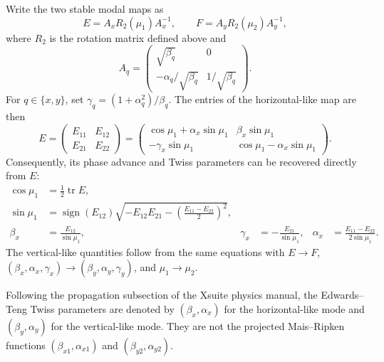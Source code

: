 \documentclass[11pt,a4paper]{article}
\newcommand{\Tr}{\operatorname{tr}}
\begin{document}
Write the two stable modal maps as
\begin{equation}
 E=A_xR_2(\mu_1)A_x^{-1},
 \qquad
 F=A_yR_2(\mu_2)A_y^{-1},
 \label{eq:et-modal-map}
\end{equation}
where $R_2$ is the rotation matrix defined above and
\begin{equation}
 A_q=
 \begin{pmatrix}
  \sqrt{\beta_q}&0\\
  -\alpha_q/\sqrt{\beta_q}&1/\sqrt{\beta_q}
 \end{pmatrix}.
 \label{eq:Aq}
\end{equation}
For $q\in\{x,y\}$, set $\gamma_q=(1+\alpha_q^2)/\beta_q$.  The entries of
the horizontal-like map are then
\begin{equation}
 E=
 \begin{pmatrix}
  E_{11}&E_{12}\\E_{21}&E_{22}
 \end{pmatrix}
 =
 \begin{pmatrix}
  \cos\mu_1+\alpha_x\sin\mu_1&\beta_x\sin\mu_1\\
  -\gamma_x\sin\mu_1&\cos\mu_1-\alpha_x\sin\mu_1
 \end{pmatrix}.
 \label{eq:E-twiss-form}
\end{equation}
Consequently, its phase advance and Twiss parameters can be recovered
directly from $E$:
\begin{align}
 \cos\mu_1
 &=\frac12\Tr E,
 \label{eq:cosmu1-from-E}\\
 \sin\mu_1
 &=\operatorname{sign}(E_{12})
   \sqrt{-E_{12}E_{21}
   -\left(\frac{E_{11}-E_{22}}{2}\right)^2},
 \label{eq:sinmu1-from-E}\\
 \beta_x&=\frac{E_{12}}{\sin\mu_1},
 &\gamma_x&=-\frac{E_{21}}{\sin\mu_1},
 &\alpha_x&=\frac{E_{11}-E_{22}}{2\sin\mu_1}.
 \label{eq:et-twiss-from-E}
\end{align}
The vertical-like quantities follow from the same equations with
$E\to F$, $(\beta_x,\alpha_x,\gamma_x)\to
(\beta_y,\alpha_y,\gamma_y)$, and $\mu_1\to\mu_2$.

Following the propagation subsection of the Xsuite physics manual, the
Edwards--Teng Twiss parameters are denoted by $(\beta_x,\alpha_x)$ for the
horizontal-like mode and $(\beta_y,\alpha_y)$ for the vertical-like mode.
They are not the projected Mais--Ripken functions
$(\beta_{x1},\alpha_{x1})$ and $(\beta_{y2},\alpha_{y2})$.
\end{document}
